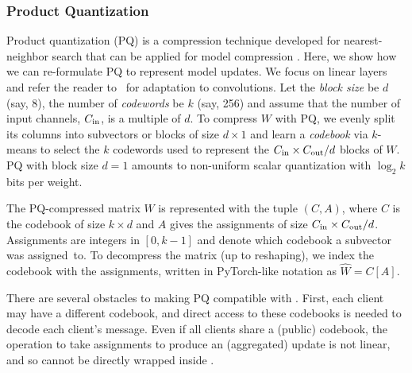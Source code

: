 \subsubsection{Product Quantization}
\label{subsec:pq}


Product quantization (PQ) is a compression technique developed for nearest-neighbor search \cite{jegou2011product} that can be applied for model compression \cite{stock2019bit}.
Here, we show how we can re-formulate PQ to represent model updates.
We focus on linear layers and refer the reader to~\cite{stock2019bit} for adaptation to convolutions.
Let the \emph{block size} be $d$ (say, 8), the number of \emph{codewords} be $k$ (say, 256) and assume that the number of input channels, $C_{\text{in}}$, is a multiple of $d$.
To compress $W$ with PQ, we evenly split its columns into subvectors or blocks of size $d \times 1$ and learn a \emph{codebook} via $k$-means to select the $k$ codewords used to represent the $C_{\text{in}}\times C_{\text{out}}/d$ blocks of $W$. PQ with block size $d=1$ amounts to non-uniform scalar quantization with $\log_2 k$ bits per weight.

The PQ-compressed matrix $W$ is represented with the tuple $(C, A)$, where $C$ is the codebook of size $k \times d$ and $A$ gives the assignments of size $C_{\text{in}} \times C_{\text{out}} / d$.
Assignments are integers in $[0, k-1]$ and denote which codebook a subvector was assigned~to.
To decompress the matrix (up to reshaping), we index the codebook with the assignments, written in PyTorch-like notation as
$
    \widehat {W} = C[A].
$

There are several obstacles to making PQ compatible with \SecAgg.
First, each client may have a different codebook, and direct access to these codebooks is needed to decode each client's message.
Even if all clients share a (public) codebook, the operation to take assignments to produce an (aggregated) update is not linear, and so cannot be directly wrapped inside \SecAgg.

